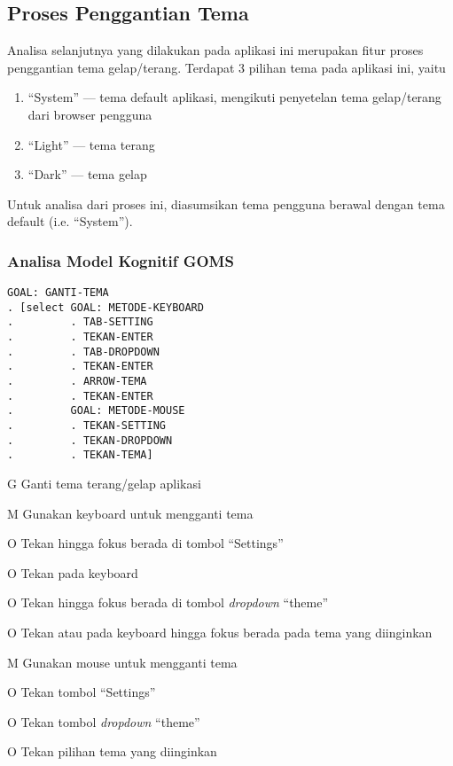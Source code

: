 \clearpage
\subsection{Proses Penggantian Tema}
Analisa selanjutnya yang dilakukan pada aplikasi ini merupakan fitur
proses penggantian tema gelap/terang. Terdapat 3 pilihan tema pada
aplikasi ini, yaitu
\begin{enumerate}
  \item ``System'' --- tema default aplikasi, mengikuti penyetelan
    tema gelap/terang dari browser pengguna
  \item ``Light'' --- tema terang
  \item ``Dark'' --- tema gelap
\end{enumerate}
Untuk analisa dari proses ini, diasumsikan tema pengguna berawal
dengan tema default (i.e. ``System'').

\subsubsection{Analisa Model Kognitif GOMS}

\begin{verbatim}
GOAL: GANTI-TEMA
. [select GOAL: METODE-KEYBOARD
.         . TAB-SETTING
.         . TEKAN-ENTER
.         . TAB-DROPDOWN
.         . TEKAN-ENTER
.         . ARROW-TEMA
.         . TEKAN-ENTER
.         GOAL: METODE-MOUSE
.         . TEKAN-SETTING
.         . TEKAN-DROPDOWN
.         . TEKAN-TEMA]
\end{verbatim}

\begin{chtbl}
  \begin{gomstbl}
    G{
      Ganti tema terang/gelap aplikasi
    }

    M{
      Gunakan keyboard untuk mengganti tema
    }

    O{
      Tekan \Tab\footnotemark hingga fokus berada di tombol ``Settings''
    }

    O{
      Tekan \Enter pada keyboard
    }

    O{
      Tekan \Tab hingga fokus berada di tombol \textit{dropdown} ``theme''
    }

    O{
      Tekan \UArrow atau \DArrow pada keyboard hingga fokus berada
      pada tema yang diinginkan
    }

    M{
      Gunakan mouse untuk mengganti tema
    }

    O{
      Tekan tombol ``Settings''
    }

    O{
      Tekan tombol \textit{dropdown} ``theme''
    }

    O{
      Tekan pilihan tema yang diinginkan
    }
  \end{gomstbl}
\end{chtbl}

